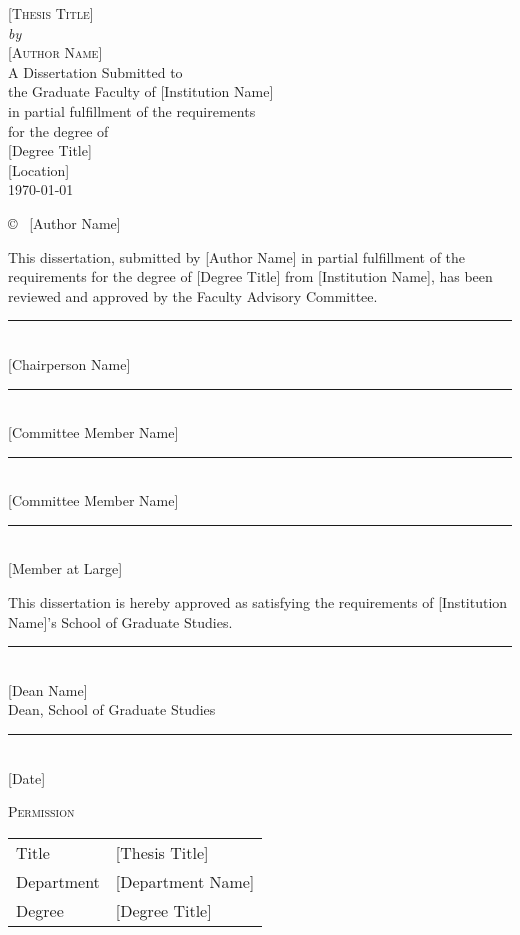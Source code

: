 \documentclass[12pt]{report}
\newcommand{\TitlePage}{
    \begin{titlepage}
        \centering
        {\large \textsc{[Thesis Title]} \\[0.4cm]}
        \vspace{2cm}
        \textit{by}\\[0.5cm]
        \textsc{[Author Name]}\\[1.5cm]
        {A Dissertation Submitted to}\\[0.5cm]
        {the Graduate Faculty of [Institution Name]}\\[1.5cm]
        {in partial fulfillment of the requirements}\\
        {for the degree of}\\[0.5cm]
        {[Degree Title]}\\[1.5cm]
        \vfill
        {[Location]}\\
        \today\\
        \thispagestyle{empty}
    \end{titlepage}
}
\begin{document}
\TitlePage

\clearpage
{}
\setcounter{page}{2} 

\newpage
\vfill
\begin{center}
    \copyright{}
    \the\year\ [Author Name]
\end{center}

\newpage
This dissertation, submitted by [Author Name] in partial fulfillment of the requirements for the degree of [Degree Title] from [Institution Name], has been reviewed and approved by the Faculty Advisory Committee.\\[1cm]
\begin{flushright}
\rule{6cm}{0.4pt} \\[0.5cm]
[Chairperson Name]\\[0.5cm]
\rule{6cm}{0.4pt} \\[0.5cm]
[Committee Member Name]\\[0.5cm]
\rule{6cm}{0.4pt} \\[0.5cm]
[Committee Member Name]\\[0.5cm]
\rule{6cm}{0.4pt} \\[0.5cm]
[Member at Large]\\[0.5cm]
\end{flushright}

This dissertation is hereby approved as satisfying the requirements of [Institution Name]'s School of Graduate Studies.

\begin{flushleft}
\rule{6cm}{0.4pt}\\[0.5cm]
[Dean Name]\\
Dean, School of Graduate Studies\\[0.5cm]
\rule{6cm}{0.4pt}\\[0.5cm]
[Date]\\
\end{flushleft}

\newpage
\begin{center}
    \textsc{\Large Permission}\\[1.5cm]
\end{center}
\vspace*{0.1in}
\begin{tabular}{@{}p{1in}p{\dimexpr\linewidth-1.5in\relax}@{}}
Title & {[Thesis Title]}\\[1.0cm]
Department & [Department Name] \\[0.5cm]
Degree & [Degree Title] \\[0.5cm]
\end{tabular}
\par
\end{document}
